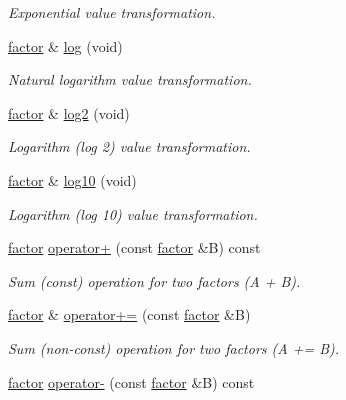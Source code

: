 \begin{DoxyCompactItemize}
\begin{DoxyCompactList}\small\item\em Exponential value transformation. \end{DoxyCompactList}\item 
\hyperlink{classmerlin_1_1factor}{factor} \& \hyperlink{classmerlin_1_1factor_afd7a5ee7905506348fa881f778fb80b1}{log} (void)
\begin{DoxyCompactList}\small\item\em Natural logarithm value transformation. \end{DoxyCompactList}\item 
\hyperlink{classmerlin_1_1factor}{factor} \& \hyperlink{classmerlin_1_1factor_a307828f6df2cd2ba6d61a32c81411144}{log2} (void)
\begin{DoxyCompactList}\small\item\em Logarithm (log 2) value transformation. \end{DoxyCompactList}\item 
\hyperlink{classmerlin_1_1factor}{factor} \& \hyperlink{classmerlin_1_1factor_aaee650c64f9cb953d78dc45a2bfeb8d2}{log10} (void)
\begin{DoxyCompactList}\small\item\em Logarithm (log 10) value transformation. \end{DoxyCompactList}\item 
\hypertarget{classmerlin_1_1factor_ad6dc4c3117cc69848d5a1170e223b017}{}\hyperlink{classmerlin_1_1factor}{factor} \hyperlink{classmerlin_1_1factor_ad6dc4c3117cc69848d5a1170e223b017}{operator+} (const \hyperlink{classmerlin_1_1factor}{factor} \&B) const \label{classmerlin_1_1factor_ad6dc4c3117cc69848d5a1170e223b017}

\begin{DoxyCompactList}\small\item\em Sum (const) operation for two factors (A + B). \end{DoxyCompactList}\item 
\hypertarget{classmerlin_1_1factor_afecdd63d805c8cd56b2ccb189650ddee}{}\hyperlink{classmerlin_1_1factor}{factor} \& \hyperlink{classmerlin_1_1factor_afecdd63d805c8cd56b2ccb189650ddee}{operator+=} (const \hyperlink{classmerlin_1_1factor}{factor} \&B)\label{classmerlin_1_1factor_afecdd63d805c8cd56b2ccb189650ddee}

\begin{DoxyCompactList}\small\item\em Sum (non-\/const) operation for two factors (A += B). \end{DoxyCompactList}\item 
\hypertarget{classmerlin_1_1factor_a35a30052a2a474fa9d54061e2135d121}{}\hyperlink{classmerlin_1_1factor}{factor} \hyperlink{classmerlin_1_1factor_a35a30052a2a474fa9d54061e2135d121}{operator-\/} (const \hyperlink{classmerlin_1_1factor}{factor} \&B) const \label{classmerlin_1_1factor_a35a30052a2a474fa9d54061e2135d121}


\end{DoxyCompactItemize}

